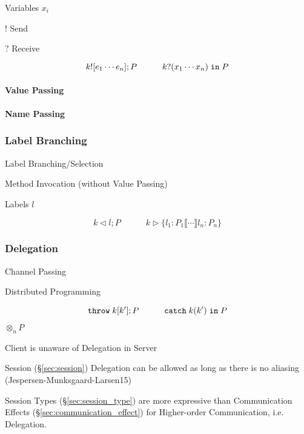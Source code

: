 Variables $x_i$

$!$ Send

$?$ Receive

\[
    k![e_1 \cdots e_n]; P
    \quad\quad\quad
    k?(x_1 \cdots x_n) \; \mathtt{in} \; P
\]



\paragraph{Value Passing}\label{sec:value_passing}\hfill

\paragraph{Name Passing}\label{sec:name_passing}\hfill



\subsubsection{Label Branching}\label{sec:label_branching}

Label Branching/Selection

Method Invocation (without Value Passing)

Labels $l$

\[
  k \lhd l; P
  \quad\quad\quad
  k \rhd \{ l_1 : P_1 \llbracket \cdots \rrbracket l_n : P_n \}
\]



\subsubsection{Delegation}\label{sec:delegation}

Channel Passing

Distributed Programming

\[
  \mathtt{throw} \; k[k']; P
  \quad\quad\quad
  \mathtt{catch} \; k(k') \; \mathtt{in} \; P
\]

$\otimes_n P$

Client is unaware of Delegation in Server

Session (\S\ref{sec:session}) Delegation can be allowed as long as
there is no aliasing (Jespersen-Munksgaard-Larsen15)

Session Types (\S\ref{sec:session_type}) are more expressive than
Communication Effects (\S\ref{sec:communication_effect}) for
Higher-order Communication, i.e. Delegation. \cite{orchard-yoshida16}




